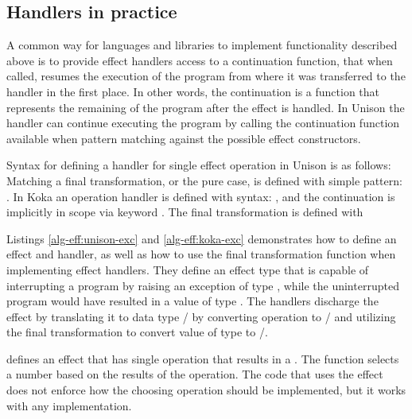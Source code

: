 \subsection{Handlers in practice}
A common way for languages and libraries to implement functionality described above is to provide effect handlers access to a continuation function, that when called, resumes the execution of the program from where it was transferred to the handler in the first place. In other words, the continuation is a function that represents the remaining of the program after the effect is handled. In Unison the handler can continue executing the program by calling the continuation function available when pattern matching against the possible effect constructors.

Syntax for defining a handler for single effect operation in Unison is as follows:
\\
Matching a final transformation, or the pure case, is defined with simple pattern:
.
In Koka an operation handler is defined with syntax: , and the continuation is implicitly in scope via keyword . The final transformation is defined with 





Listings \ref{alg-eff:unison-exc} and \ref{alg-eff:koka-exc} demonstrates how to define an effect and handler, as well as how to use the final transformation function when implementing effect handlers. They define an effect type  that is capable of interrupting a program by raising an exception of type , while the uninterrupted program would have resulted in a value of type . The handlers discharge the effect by translating it to data type / by converting  operation to / and utilizing the final transformation to convert value of type  to /.

 defines an effect  that has single operation  that results in a . The function  selects a number based on the results of the  operation. The code that uses the effect does not enforce how the choosing operation should be implemented, but it works with any implementation.


